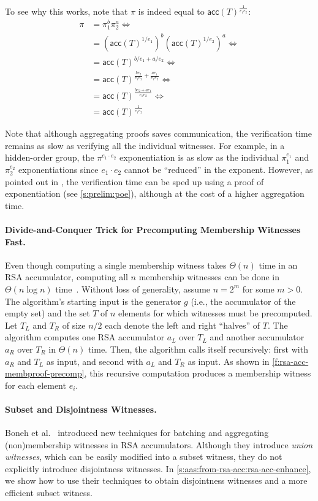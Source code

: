 To see why this works, note that $\pi$ is indeed equal to $\mathsf{acc}(T)^{\frac{1}{e_1 e_2}}$:
\begin{align*}
\pi &= \pi_1^b \pi_2^a\Leftrightarrow\\
              &= \left(\mathsf{acc}(T)^{1/e_1}\right)^b \left(\mathsf{acc}(T)^{1/e_2}\right)^a \Leftrightarrow\\
              &= \mathsf{acc}(T)^{b/e_1+a/e_2} \Leftrightarrow\\
              &= \mathsf{acc}(T)^{\frac{b e_2}{e_1 e_2}+\frac{a e_1}{e_1 e_2}} \Leftrightarrow\\
              &= \mathsf{acc}(T)^\frac{b e_2 + a e_1}{e_1 e_2} \Leftrightarrow\\
              &= \mathsf{acc}(T)^\frac{1}{e_1 e_2}
\end{align*}

Note that although aggregating proofs saves communication, the verification time remains as slow as verifying all the individual witnesses.
For example, in a hidden-order group, the $\pi^{e_1\cdot e_2}$ exponentiation is as slow as the individual $\pi_1^{e_1}$ and $\pi_2^{e_2}$ exponentiations since $e_1 \cdot e_2$ cannot be ``reduced'' in the exponent.
However, as pointed out in \cite{BBF19}, the verification time can be sped up using a proof of exponentiation (see \cref{s:prelim:poe}), although at the cost of a higher aggregation time.

\rsaPrecompFigure

\paragraph{Divide-and-Conquer Trick for Precomputing Membership Witnesses Fast.}
Even though computing a single membership witness takes $\Theta(n)$ time in an RSA accumulator, computing all $n$ membership witnesses can be done in $\Theta(n\log{n})$ time~\cite{SSY01}.
Without loss of generality, assume $n=2^m$ for some $m>0$.
The algorithm's starting input is the generator $g$ (i.e., the accumulator of the empty set) and the set $T$ of $n$ elements for which witnesses must be precomputed.
Let $T_L$ and $T_R$ of size $n/2$ each denote the left and right ``halves'' of $T$.
The algorithm computes one RSA accumulator $a_L$ over $T_L$ and another accumulator $a_R$ over $T_R$ in $\Theta(n)$ time.
Then, the algorithm calls itself recursively: first with $a_R$ and $T_L$ as input, and second with $a_L$ and $T_R$ as input.
As shown in \cref{f:rsa-acc-membproof-precomp}, this recursive computation produces a membership witness for each element $e_i$.

\paragraph{Subset and Disjointness Witnesses.}
Boneh et al.~\cite{BBF19} introduced new techniques for batching and aggregating (non)membership witnesses in RSA accumulators.
Although they introduce \textit{union witnesses}, which can be easily modified into a subset witness, they do not explicitly introduce disjointness witnesses.
In \cref{s:aas:from-rsa-acc:rsa-acc-enhance}, we show how to use their techniques to obtain disjointness witnesses and a more efficient subset witness.